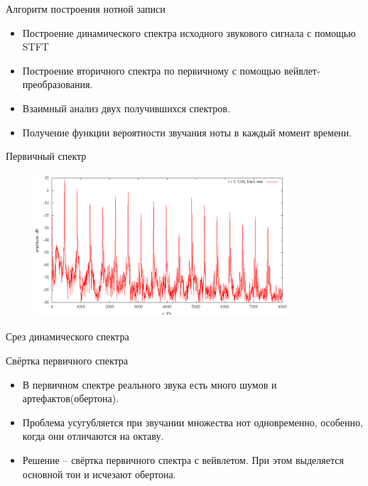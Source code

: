 \documentclass[11pt,slides,aspectratio=43]{beamer}%
\begin{document}
    \begin{frame}{Алгоритм построения нотной записи}
        \begin{itemize}
            \item Построение динамического спектра исходного звукового сигнала с помощью STFT
            \item Построение вторичного спектра по первичному с помощью вейвлет-преобразования.
            \item Взаимный анализ двух получившихся спектров.
            \item Получение функции вероятности звучания ноты в каждый момент времени.
        \end{itemize}
    \end{frame}

    \begin{frame}{Первичный спектр}
        \begin{figure}[h!]
            \begin{center}
                \includegraphics[width = 0.85\textwidth]{firstSpectrum.png}
            \end{center}
        \end{figure}
        \begin{center}
           Срез динамического спектра
        \end{center}
    \end{frame}

    \begin{frame}{Свёртка первичного спектра}
        \begin{itemize}
            \item В первичном спектре реального звука есть много шумов и артефактов(обертона).
            \item Проблема усугубляется при звучании множества нот одновременно, особенно, когда они отличаются на октаву.
            \item Решение -- свёртка первичного спектра с вейвлетом. При этом выделяется основной тон и исчезают обертона.
        \end{itemize}
    \end{frame}
\end{document}
